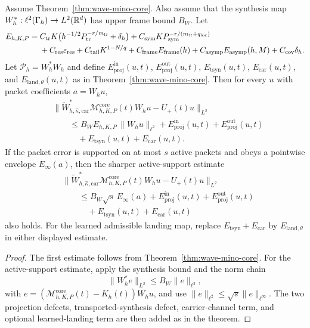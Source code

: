\begin{corollary}
\label{cor:field-level-mpt}
Assume Theorem~\ref{thm:wave-mino-core}.  Also assume that the synthesis map $W_h^\ast:\ell^2(\Gamma_h)\to L^2(\mathbb R^d)$ has upper frame bound $B_W$. Let
\begin{align*}
E_{h,K,P}
={}&
C_{\mathrm{tr}}K\bigl(h^{-1/2}P_{\mathrm{tr}}^{-r/m_\Omega}+\delta_h\bigr)
+C_{\mathrm{sym}}K P_{\mathrm{sym}}^{-r/(m_\Omega+q_{\mathrm{loc}})}\\
&+C_{\mathrm{res}}\varepsilon_{\mathrm{res}}
+C_{\mathrm{tail}}K^{1-N/q}
+C_{\mathrm{frame}}E_{\mathrm{frame}}(h)
+C_{\mathrm{asymp}}E_{\mathrm{asymp}}(h,M)
+C_{\mathrm{cov}}\delta_h .
\end{align*}
Let $\mathcal P_h=W_h^\ast W_h$ and define $E_{\mathrm{proj}}^{\mathrm{in}}(u,t)$, $E_{\mathrm{proj}}^{\mathrm{out}}(u,t)$, $E_{\mathrm{tsyn}}(u,t)$, $E_{\mathrm{car}}(u,t)$, and $E_{\mathrm{land},\theta}(u,t)$ as in Theorem~\ref{thm:wave-mino-core}.
Then for every $u$ with packet coefficients $a=W_hu$,
\[
\begin{aligned}
&\|\widetilde W_{h,\widehat\kappa,\mathrm{car}}^{\ast}
\mathcal M_{h,K,P}^{\mathrm{core}}(t)W_hu
-U_+(t)u\|_{L^2} \\
&\qquad \le
B_W E_{h,K,P}\,\|W_hu\|_{\ell^2}
+E_{\mathrm{proj}}^{\mathrm{in}}(u,t)
+E_{\mathrm{proj}}^{\mathrm{out}}(u,t) \\
&\qquad\quad
+E_{\mathrm{tsyn}}(u,t)
+E_{\mathrm{car}}(u,t).
\end{aligned}
\]
If the packet error is supported on at most $s$ active packets and obeys a pointwise envelope $E_\infty(a)$, then the sharper active-support estimate
\[
\begin{aligned}
&\|\widetilde W_{h,\widehat\kappa,\mathrm{car}}^{\ast}
\mathcal M_{h,K,P}^{\mathrm{core}}(t)W_hu
-U_+(t)u\|_{L^2} \\
&\qquad \le
B_W\sqrt{s}\,E_\infty(a)
+E_{\mathrm{proj}}^{\mathrm{in}}(u,t)
+E_{\mathrm{proj}}^{\mathrm{out}}(u,t) \\
&\qquad\quad
+E_{\mathrm{tsyn}}(u,t)
+E_{\mathrm{car}}(u,t)
\end{aligned}
\]
also holds.
For the learned admissible landing map, replace $E_{\mathrm{tsyn}}+E_{\mathrm{car}}$ by $E_{\mathrm{land},\theta}$ in either displayed estimate.
\end{corollary}

\begin{proof}
The first estimate follows from Theorem~\ref{thm:wave-mino-core}. For the active-support estimate, apply the synthesis bound and the norm chain
\[
\|W_h^\ast e\|_{L^2}\le B_W\|e\|_{\ell^2},
\]
with $e=(\mathcal M_{h,K,P}^{\mathrm{core}}(t)-K_h(t))W_hu$, and use $\|e\|_{\ell^2}\le \sqrt{s}\|e\|_{\ell^\infty}$. The two projection defects, transported-synthesis defect, carrier-channel term, and optional learned-landing term are then added as in the theorem.
\end{proof}

